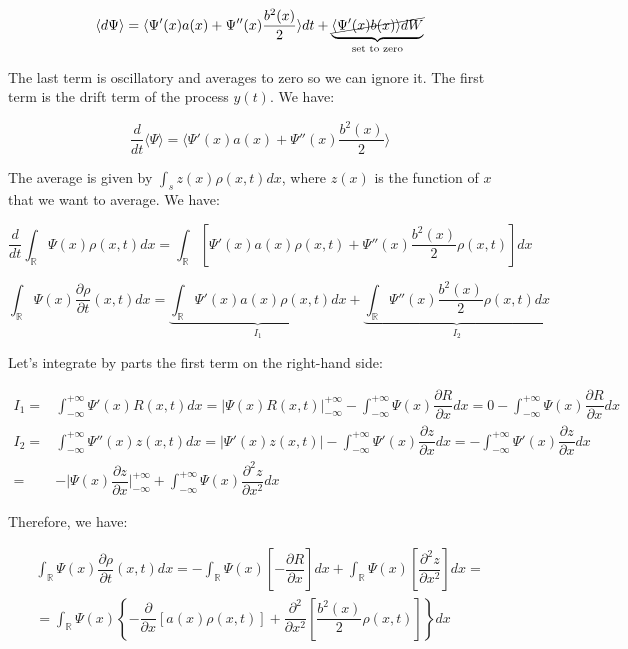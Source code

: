 $$
\langle d\Psi \rangle = \langle \Psi'(x) a(x) + \Psi''(x) \dfrac{b^2(x)}{2} \rangle dt + \underbrace{\cancel{\langle \Psi'(x) b(x) \rangle dW}}_{\text{set to zero}}
$$

The last term is oscillatory and averages to zero so we can ignore it. The first term is the drift term of the process $y(t)$. We have:

$$
\dfrac{d}{dt}\langle\Psi\rangle = \langle \Psi'(x) a(x) + \Psi''(x) \dfrac{b^2(x)}{2} \rangle
$$

The average is given by $\int_{s} z(x) \rho(x,t) dx$, where $z(x)$ is the function of $x$ that we want to average. We have:

$$
\dfrac{d}{dt} \int_{\mathbb{R}} \Psi(x) \rho(x,t) dx = \int_{\mathbb{R}} \left[\Psi'(x)a(x)\rho(x,t) + \Psi''(x) \dfrac{b^2(x)}{2} \rho(x,t)\right] dx
$$

$$
\int_{\mathbb{R}} \Psi(x) \dfrac{\partial\rho}{\partial t}(x,t) dx 
=
\underbrace{\int_{\mathbb{R}} \Psi'(x) a(x) \rho(x,t) dx}_{I_1} + \underbrace{\int_{\mathbb{R}} \Psi''(x) \dfrac{b^2(x)}{2} \rho(x,t) dx}_{I_2}
$$

Let's integrate by parts the first term on the right-hand side:

$$
\begin{array}{rll}
I_1 = & \int_{-\infty}^{+\infty} \Psi'(x) R(x, t) dx = \big|\Psi(x) R(x, t)\big|_{-\infty}^{+\infty} - \int_{-\infty}^{+\infty} \Psi(x) \dfrac{\partial R}{\partial x} dx = 0 - \int_{-\infty}^{+\infty} \Psi(x) \dfrac{\partial R}{\partial x} dx
\\
I_2 = & \int_{-\infty}^{+\infty} \Psi''(x) z(x,t) dx
=
\big|\Psi'(x)z(x,t) \big| - \int_{-\infty}^{+\infty} \Psi'(x) \dfrac{\partial z}{\partial x} dx
=
- \int_{-\infty}^{+\infty} \Psi'(x) \dfrac{\partial z}{\partial x} dx
\\ = &
- \big|\Psi(x) \dfrac{\partial z}{\partial x} \big|_{-\infty}^{+\infty} + \int_{-\infty}^{+\infty} \Psi(x) \dfrac{\partial^2 z}{\partial x^2} dx
\end{array}
$$

Therefore, we have:

$$
\begin{array}{l}
    \displaystyle
    \int_{\mathbb{R}} \Psi(x) \dfrac{\partial\rho}{\partial t}(x,t) dx = - \int_{\mathbb{R}} \Psi(x) \left[ - \dfrac{\partial R}{\partial x} \right] dx + \int_{\mathbb{R}} \Psi(x) \left[ \dfrac{\partial^2 z}{\partial x^2} \right] dx
= 
\\
\displaystyle
=
\int_{\mathbb{R}} \Psi(x) \left\{ - \dfrac{\partial}{\partial x} \left[ a(x) \rho(x,t) \right] + \dfrac{\partial^2}{\partial x^2} \left[ \dfrac{b^2(x)}{2} \rho(x,t) \right] \right\} dx
\end{array}
$$

